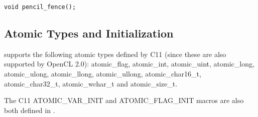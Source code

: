 \lstinline!void pencil_fence();!



\subsection{Atomic Types and Initialization}
\pencil supports the following atomic types defined by C11 (since these are
also supported by OpenCL 2.0):
atomic_flag, atomic_int, atomic_uint, atomic_long, atomic_ulong, atomic_llong,
atomic_ullong, atomic_char16_t, atomic_char32_t, atomic_wchar_t and
atomic_size_t.

The C11 ATOMIC_VAR_INIT and ATOMIC_FLAG_INIT macros are also both defined
in \pencil.


